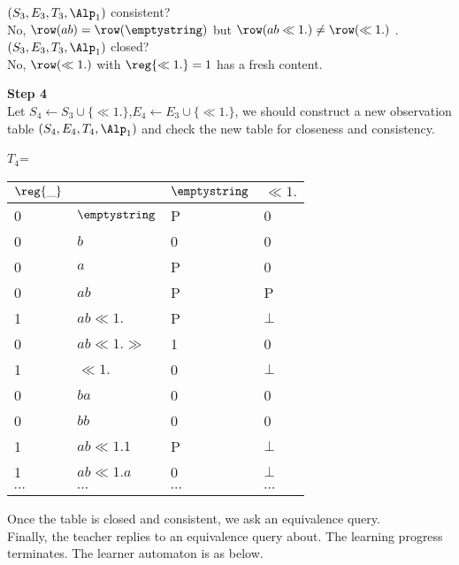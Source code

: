 \begin{minipage}{0.5\textwidth}
  $(S_3,E_3,T_3,{\Alp}_1)$ consistent? \\
  No, $\row(ab)=\row(\emptystring)$ but $\row(ab\ll 1.)\neq \row(\ll 1.)$ . \\
  $(S_3,E_3,T_3,{\Alp}_1)$ closed? \\
   No,  $\row(\ll 1.)$ with $\reg{\ll 1.}=1$ has a fresh content. \\
\end{minipage}
\textbf{Step 4}\\
Let $S_4\leftarrow S_3\cup \{\ll 1. \}$,$E_4\leftarrow E_3\cup \{\ll 1.\}$, we should construct a new observation table $(S_4,E_4,T_4,{\Alp}_1)$ and check the new table for closeness and consistency.\\
\begin{minipage}{0.5\textwidth}
  \begin{center}
    $T_4$=
     \begin{tabular}{l|l|l|l}
    
    {$\reg{\_}$}  &{}  &      {$\emptystring$}   &      {$\ll 1.$} \\
    \hline
    {0}  &${\emptystring}$ & {P} & {0}\\
    
    {0}  &{$b$} & {0} & {0}\\
    {0}  &{$a$} & {P}& {0}\\
    {0}  &{$ab$} & {P}& {P}\\
    {1}  &{$ab\ll 1.$} & {P} & {$\bot$}\\
    {0}  & {$ab\ll 1.\gg$} & {1} & {0}\\	
    {1}  &{$\ll 1.$} & {0}& {$\bot$}\\
    \hline
    {0}  &	{$ba$} & {0}& {0}\\
    {0}  &	{$bb$} & {0}& {0}\\
    {1}  &	{$ab\ll 1.1$} & {P} & {$\bot$}\\
    {1}  &{$ab\ll 1.a$} & {0}  & {$\bot$}\\
    {$\cdots$}  &{$\cdots$} & {$\cdots$} & {$\cdots$}\\
  \end{tabular}
  \end{center}
\end{minipage}
\begin{minipage}{0.5\textwidth}
Once the table is closed and consistent, we ask an equivalence query.\\
Finally, the teacher replies  to an equivalence query about. The learning progress terminates. The learner automaton is as below.\\
\end{minipage}

